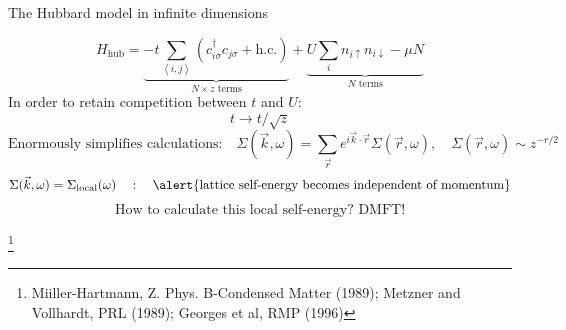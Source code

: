 \documentclass[9pt,aspectratio=169]{beamer}
\begin{document}
\begin{frame}{The Hubbard model in infinite dimensions}

	\[H_\text{hub} = \underbrace{-t\sum_{\left<i,j\right>}\left(c^\dagger_{i\sigma}c_{j\sigma} + \text{h.c.}\right)}_{N\times z \text{ terms}} + \underbrace{U\sum_i n_{i \uparrow}n_{i \downarrow} - \mu N}_{N \text{ terms}}\]
	In order to retain competition between \(t\) and \(U\): 
	\[t \to t/\sqrt{z}\]
	\[\text{Enormously simplifies calculations:} \quad \Sigma(\vec k,\omega) = \sum_{\vec r}e^{i \vec{k}\cdot\vec{r}}\Sigma(\vec r, \omega), \quad \Sigma(\vec r, \omega) \sim z^{-r/2}\]
	\[\Sigma(\vec k,\omega) = \Sigma_\text{local}(\omega) \quad:\quad\text{\alert{lattice self-energy becomes independent of momentum}}\]
	\[\text{How to calculate this local self-energy? DMFT!}\]

	\footnote{Miiller-Hartmann, Z. Phys. B-Condensed Matter (1989); Metzner and Vollhardt, PRL (1989); Georges et al, RMP (1996)}
\end{frame}
\end{document}
